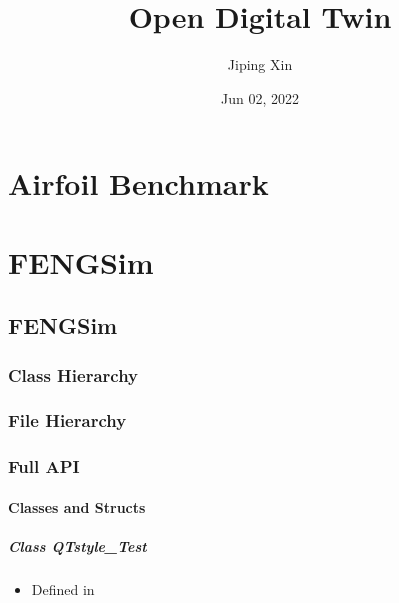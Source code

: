 \documentclass[letterpaper,10pt,english]{sphinxmanual}
\title{Open Digital Twin}
\date{Jun 02, 2022}
\author{Jiping Xin}
\begin{document}
\pagestyle{empty}
\sphinxmaketitle
\pagestyle{plain}
\sphinxtableofcontents
\pagestyle{normal}
\label{\detokenize{index::doc}}



\chapter{Airfoil Benchmark}
\label{\detokenize{index:airfoil-benchmark}}

\chapter{FENGSim}
\label{\detokenize{index:fengsim}}
\sphinxstepscope


\section{FENGSim}
\label{\detokenize{api/library_root:fengsim}}\label{\detokenize{api/library_root::doc}}

\subsection{Class Hierarchy}
\label{\detokenize{api/library_root:class-hierarchy}}



\subsection{File Hierarchy}
\label{\detokenize{api/library_root:file-hierarchy}}



\subsection{Full API}
\label{\detokenize{api/library_root:full-api}}

\subsubsection{Classes and Structs}
\label{\detokenize{api/library_root:classes-and-structs}}
\sphinxstepscope


\paragraph{Class QTstyle\_Test}
\label{\detokenize{api/classQTstyle__Test:class-qtstyle-test}}\label{\detokenize{api/classQTstyle__Test:exhale-class-classqtstyle-test}}\label{\detokenize{api/classQTstyle__Test::doc}}\begin{itemize}
\item {} 
\sphinxAtStartPar
Defined in 

\end{itemize}
\end{document}
